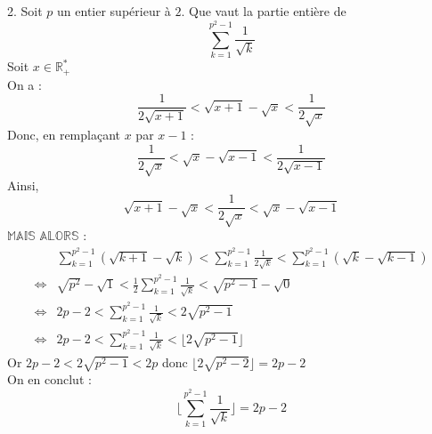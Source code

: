 \documentclass[10pt]{article}
\begin{document}
\begin{tcolorbox}[enhanced, width=6in, center, size=fbox, fontupper=\large, drop shadow southwest]
    2. Soit $p$ un entier supérieur à $2$. Que vaut la partie entière de
    \begin{equation*}
        \sum_{k=1}^{p^2-1}{\frac{1}{\sqrt{k}}}
    \end{equation*}
    Soit $x\in\mathbb{R}^*_+$\\
    On a :
    \begin{equation*}
        \frac{1}{2\sqrt{x+1}}<\sqrt{x+1}-\sqrt{x}<\frac{1}{2\sqrt{x}}
    \end{equation*}
    Donc, en remplaçant $x$ par $x-1$ :
    \begin{equation*}
        \frac{1}{2\sqrt{x}}<\sqrt{x}-\sqrt{x-1}<\frac{1}{2\sqrt{x-1}}
    \end{equation*}
    Ainsi,
    \begin{equation*}
        \sqrt{x+1}-\sqrt{x}<\frac{1}{2\sqrt{x}}<\sqrt{x}-\sqrt{x-1}
    \end{equation*}
    $\mathbb{MAIS}$ $\mathbb{ALORS}$ :
    \begin{align*}
        &\sum^{p^2-1}_{k=1}{\left(\sqrt{k+1}-\sqrt{k}\right)}<\sum^{p^2-1}_{k=1}{\frac{1}{2\sqrt{k}}}<\sum^{p^2-1}_{k=1}{\left(\sqrt{k}-\sqrt{k-1}\right)}\\
        \iff&\sqrt{p^2}-\sqrt{1}<\frac{1}{2}\sum^{p^2-1}_{k=1}{\frac{1}{\sqrt{k}}}<\sqrt{p^2-1}-\sqrt{0}\\
        \iff&2p-2<\sum^{p^2-1}_{k=1}{\frac{1}{\sqrt{k}}}<2\sqrt{p^2-1}\\
        \iff&2p-2<\sum^{p^2-1}_{k=1}{\frac{1}{\sqrt{k}}}<\lfloor{2\sqrt{p^2-1}}\rfloor
    \end{align*}
    Or $2p-2<2\sqrt{p^2-1}<2p$ donc $\lfloor{2\sqrt{p^2-2}}\rfloor=2p-2$\\
    On en conclut : 
    \begin{equation*}
        \lfloor{\sum^{p^2-1}_{k=1}{\frac{1}{\sqrt{k}}}}\rfloor = 2p-2
    \end{equation*}
\end{tcolorbox}
\end{document}
